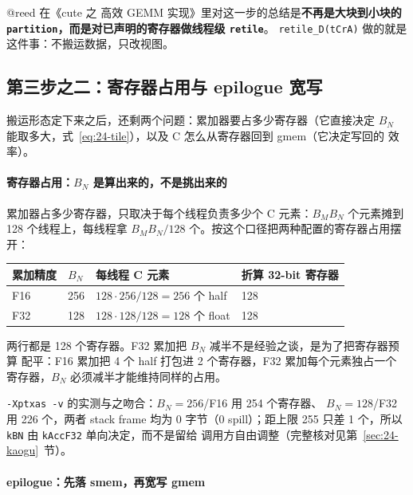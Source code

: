 @reed 在《cute 之 高效 GEMM 实现》里对这一步的总结是\textbf{不再是大块到小块的
\texttt{partition}，而是对已声明的寄存器做线程级 \texttt{retile}}。
\texttt{retile\_\allowbreak{}D\allowbreak{}(t\allowbreak{}Cr\allowbreak{}A)}
做的就是这件事：不搬运数据，只改视图。

\subsection{第三步之二：寄存器占用与 epilogue 宽写}\label{sec:24-step3b}

搬运形态定下来之后，还剩两个问题：累加器要占多少寄存器（它直接决定 $B_N$
能取多大，式~\eqref{eq:24-tile}），以及 C 怎么从寄存器回到 gmem（它决定写回的
效率）。

\paragraph{寄存器占用：$B_N$ 是算出来的，不是挑出来的}

累加器占多少寄存器，只取决于每个线程负责多少个 C 元素：$B_M B_N$ 个元素摊到
128 个线程上，每线程拿 $B_M B_N/128$ 个。按这个口径把两种配置的寄存器占用摆开：

\begin{center}
\begin{tabular}{llll}
\toprule
累加精度 & $B_N$ & 每线程 C 元素 & 折算 32-bit 寄存器 \\
\midrule
F16 & 256 & $128\cdot256/128=256$ 个 half & 128 \\
F32 & 128 & $128\cdot128/128=128$ 个 float & 128 \\
\bottomrule
\end{tabular}
\end{center}

两行都是 128 个寄存器。F32 累加把 $B_N$ 减半不是经验之谈，是为了把寄存器预算
配平：F16 累加把 4 个 half 打包进 2 个寄存器，F32 累加每个元素独占一个
寄存器，$B_N$ 必须减半才能维持同样的占用。

\texttt{-Xptxas -v} 的实测与之吻合：$B_N{=}256$/F16 用 254 个寄存器、
$B_N{=}128$/F32 用 226 个，两者 stack frame 均为 0 字节（0 spill）；距上限
255 只差 1 个，所以 \texttt{kBN} 由 \texttt{kAccF32} 单向决定，而不是留给
调用方自由调整（完整核对见第~\ref{sec:24-kaogu}~节）。

\paragraph{epilogue：先落 smem，再宽写 gmem}

